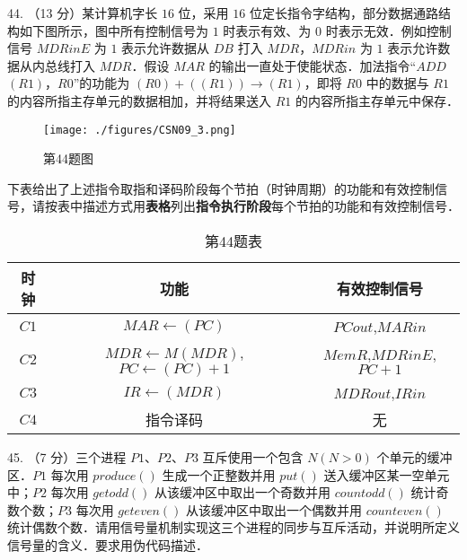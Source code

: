44. （13 分）某计算机字长 $16$ 位，采用 $16$ 位定长指令字结构，部分数据通路结构如下图所示，图中所有控制信号为 $1$ 时表示有效、为 $0$ 时表示无效．例如控制信号 $MDRinE$ 为 $1$ 表示允许数据从 $DB$ 打入 $MDR$，$MDRin$ 为 $1$ 表示允许数据从内总线打入 $MDR$．假设 $MAR$ 的输出一直处于使能状态．加法指令“$ADD$ $(R1)$，$R0$”的功能为 $(R0)+((R1)) \rightarrow (R1)$，即将 $R0$ 中的数据与 $R1$ 的内容所指主存单元的数据相加，并将结果送入 $R1$ 的内容所指主存单元中保存．
\begin{figure}[ht]
\centering
\texttt{[image: ./figures/CSN09\_3.png]}
\caption{第44题图} \label{CSN09_fig3}
\end{figure}
下表给出了上述指令取指和译码阶段每个节拍（时钟周期）的功能和有效控制信号，请按表中描述方式用\textbf{表格}列出\textbf{指令执行阶段}每个节拍的功能和有效控制信号．
\begin{table}[ht]
\centering
\caption{第44题表}\label{CSN09_tab2}
\begin{tabular}{|c|c|c|}
\hline
时钟 & 功能 & 有效控制信号 \\
\hline
$C1$ & $MAR\leftarrow(PC)$ & $PCout$,$MARin$ \\
\hline
$C2$ & $MDR\leftarrow M(MDR)$,$PC\leftarrow(PC)+1$ & $MemR$,$MDRinE$,$PC+1$ \\
\hline
$C3$ & $IR\leftarrow(MDR)$ & $MDRout$,$IRin$ \\
\hline
$C4$ & 指令译码 & 无 \\
\hline
\end{tabular}
\end{table}

45. （7 分）三个进程 $P1$、$P2$、$P3$ 互斥使用一个包含 $N(N>0)$ 个单元的缓冲区．$P1$ 每次用 $produce()$ 生成一个正整数并用 $put()$ 送入缓冲区某一空单元中；$P2$ 每次用 $getodd()$ 从该缓冲区中取出一个奇数并用 $countodd()$ 统计奇数个数；$P3$ 每次用 $geteven()$ 从该缓冲区中取出一个偶数并用 $counteven()$ 统计偶数个数．请用信号量机制实现这三个进程的同步与互斥活动，并说明所定义信号量的含义．要求用伪代码描述．

